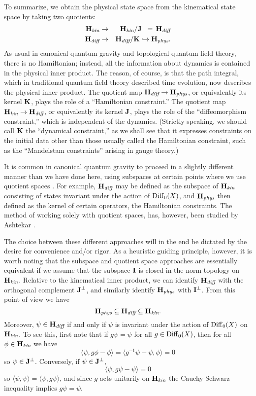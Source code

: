 \documentclass[12pt]{article}
\newcommand{\ban}{\begin{eqnarray*}}
\newcommand{\ean}{\end{eqnarray*}}
\renewcommand{\H}{{\bf H}}
\newcommand{\I}{{\bf I}}
\newcommand{\J}{{\bf J}}
\newcommand{\K}{{\bf K}}
\newcommand{\Diff}{{\rm Diff}}
\begin{document}
To summarize, we obtain the physical state space from the kinematical
state space by taking two quotients:
\ban         \H_{\textit{kin}} &\to&  \H_{\textit{kin}}/\J \;\; =\, \H_{\textit{diff}} \\
             \H_{\textit{diff}} &\to&  \H_{\textit{diff}}/\K \hookrightarrow \H_{\textit{phys}}. \ean
As usual in canonical quantum gravity and topological quantum field
theory, there is no Hamiltonian; instead, all the information about
dynamics is contained in the physical inner product.   The reason, of
course, is that the path integral, which in traditional quantum field
theory described time evolution, now describes the physical inner product.
The quotient map $\H_{\textit{diff}} \to \H_{\textit{phys}}$, or equivalently its kernel
$\K$, plays the role of a ``Hamiltonian constraint.''     The quotient map
$\H_{\textit{kin}} \to \H_{\textit{diff}}$, or equivalently its kernel $\J$, plays the role
of the ``diffeomorphism constraint,'' which is independent of the dynamics.
(Strictly speaking, we should call $\K$ the ``dynamical constraint,'' as we
shall see that it expresses constraints on the initial data other than
those usually called the Hamiltonian constraint, such as the ``Mandelstam
constraints'' arising in gauge theory.)

It is common in canonical quantum gravity to proceed in a slightly
different manner than we have done here, using subspaces at certain points
where we use quotient spaces \cite{RS,RS2}. For example, $\H_{\textit{diff}}$ may be
defined as the subspace of $\H_{\textit{kin}}$ consisting of states invariant under
the action of $\Diff_0(X)$, and $\H_{\textit{phys}}$ then defined as the kernel of
certain operators, the Hamiltonian constraints.   The method of working
solely with quotient spaces, has, however, been studied by Ashtekar
\cite{Ash}.

The choice between these different approaches will in the end be
dictated by the desire for convenience and/or rigor.  As a heuristic
guiding principle, however, it is worth noting that
the subspace and quotient space approaches are essentially equivalent if
we assume that the subspace $\I$ is closed in the norm topology on
$\H_{\textit{kin}}$.   Relative to the kinematical inner product, we can identify
$\H_{\textit{diff}}$ with the orthogonal complement $\J^\perp$, and similarly identify
$\H_{\textit{phys}}$ with $\I^\perp$.  From this point of
view we have
\[             \H_{\textit{phys}} \subseteq \H_{\textit{diff}} \subseteq \H_{\textit{kin}}  .\]
Moreover, $\psi \in
\H_{\textit{diff}}$ if and only if $\psi$ is invariant under the action of
$\Diff_0(X)$ on $\H_{\textit{kin}}$.
To see this, first note that if $g\psi = \psi$ for all $g\in
\Diff_0(X)$, then for all $\phi \in \H_{\textit{kin}}$ we have
\[         \langle \psi, g\phi - \phi \rangle =
\langle g^{-1}\psi - \psi, \phi \rangle = 0 \]
so $\psi \in \J^{\perp}$.   Conversely, if $\psi \in \J^\perp$,
\[        \langle \psi, g\psi - \psi\rangle = 0 \]
so $\langle \psi,\psi \rangle = \langle\psi,g\psi \rangle$, and since
$g$ acts unitarily on $\H_{\textit{kin}}$ the Cauchy-Schwarz inequality implies
$g\psi = \psi$.
\end{document}
